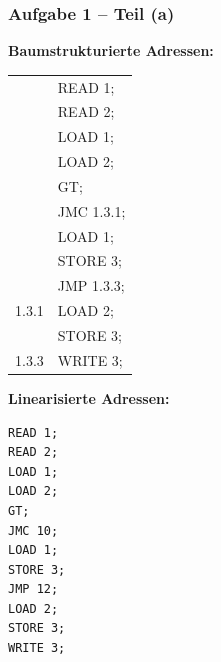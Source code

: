 \documentclass{beamer}
\begin{document}
\begin{frame}[fragile, t] \frametitle{Aufgabe 1 -- Teil (a)}
	\small 
	\begin{minipage}[t]{\dimexpr0.5\linewidth-\fboxrule-\fboxsep}
		\textbf{Baumstrukturierte Adressen:}  \\
		
		\footnotesize
		\begin{tabular}{>{\ttfamily}r >{\ttfamily}l}
			& READ 1; \\
			& READ 2; \\
			& LOAD 1; \\
			& LOAD 2; \\
			& GT; \\
			& JMC 1.3.1; \\
			& LOAD 1; \\
			& STORE 3; \\
			& JMP 1.3.3; \\
			\textcolor{cdgray!50}{\tiny 1.3.1} & LOAD 2; \\
			& STORE 3; \\
			\textcolor{cdgray!50}{\tiny 1.3.3} & WRITE 3; 
		\end{tabular}
	\end{minipage}
	\pause \hfill
	\begin{minipage}[t]{\dimexpr0.4\linewidth-\fboxrule-\fboxsep}
		\textbf{Linearisierte Adressen:} \\
		\vspace{-8pt}
		\begin{lstlisting}[style=am0]
READ 1;
READ 2;
LOAD 1;
LOAD 2;
GT; 
JMC 10;
LOAD 1;
STORE 3;
JMP 12;
LOAD 2;
STORE 3;
WRITE 3; 
		\end{lstlisting}
	\end{minipage}
\end{frame}
\end{document}
